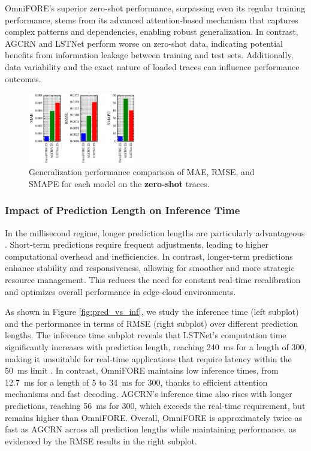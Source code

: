 OmniFORE's superior zero-shot performance, surpassing even its regular training performance, stems from its advanced attention-based mechanism that captures complex patterns and dependencies, enabling robust generalization. In contrast, AGCRN and LSTNet perform worse on zero-shot data, indicating potential benefits from information leakage between training and test sets. Additionally, data variability and the exact nature of loaded traces can influence performance outcomes.

\begin{figure}%
\centering
\includegraphics[width=0.42\textwidth]{img/metrics_comparison_zs.eps}
\caption{Generalization performance comparison of MAE, RMSE, and SMAPE for each model on the \textbf{zero-shot} traces.}
\label{fig:metrics_comparison_ZS}
\end{figure}


\subsubsection{\textbf{Impact of Prediction Length on Inference Time}}

In the millisecond regime, longer prediction lengths are particularly advantageous \cite{9500858}. Short-term predictions require frequent adjustments, leading to higher computational overhead and inefficiencies. In contrast, longer-term predictions enhance stability and responsiveness, allowing for smoother and more strategic resource management. This reduces the need for constant real-time recalibration and optimizes overall performance in edge-cloud environments.

As shown in Figure \ref{fig:pred_vs_inf}, we study the inference time (left subplot) and the performance in terms of RMSE (right subplot) over different prediction lengths. The inference time subplot reveals that LSTNet's computation time significantly increases with prediction length, reaching \SI{240}{\milli\second} for a length of 300, making it unsuitable for real-time applications that require latency within the \SI{50}{\milli\second} limit \cite{8334540}. In contrast, OmniFORE maintains low inference times, from \SI{12.7}{\milli\second} for a length of 5 to \SI{34}{\milli\second} for 300, thanks to efficient attention mechanisms and fast decoding. AGCRN's inference time also rises with longer predictions, reaching \SI{56}{\milli\second} for 300, which exceeds the real-time requirement, but remains higher than OmniFORE. Overall, OmniFORE is approximately twice as fast as AGCRN across all prediction lengths while maintaining performance, as evidenced by the RMSE results in the right subplot.


